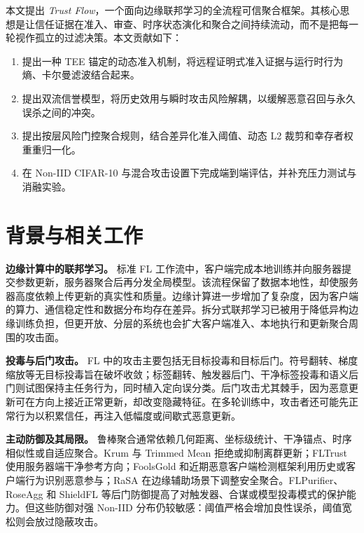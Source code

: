 \documentclass[10pt,a4paper,UTF8,fontset=fandol]{ctexart}
\newenvironment{tightenumerate}{%
  \begin{enumerate}\setlength{\itemsep}{1pt}\setlength{\parskip}{0pt}\setlength{\parsep}{0pt}}{\end{enumerate}}
\begin{document}
本文提出 \emph{Trust Flow}，一个面向边缘联邦学习的全流程可信聚合框架。其核心思想是让信任证据在准入、审查、时序状态演化和聚合之间持续流动，而不是把每一轮视作孤立的过滤决策。本文贡献如下：
\begin{tightenumerate}
    \item 提出一种 TEE 锚定的动态准入机制，将远程证明式准入证据与运行时行为熵、卡尔曼滤波结合起来。
    \item 提出双流信誉模型，将历史效用与瞬时攻击风险解耦，以缓解恶意召回与永久误杀之间的冲突。
    \item 提出按层风险门控聚合规则，结合差异化准入阈值、动态 L2 裁剪和幸存者权重重归一化。
    \item 在 Non-IID CIFAR-10 与混合攻击设置下完成端到端评估，并补充压力测试与消融实验。
\end{tightenumerate}

\section{背景与相关工作}

\textbf{边缘计算中的联邦学习。} 标准 FL 工作流中，客户端完成本地训练并向服务器提交参数更新，服务器聚合后再分发全局模型。该流程保留了数据本地性，却使服务器高度依赖上传更新的真实性和质量。边缘计算进一步增加了复杂度，因为客户端的算力、通信稳定性和数据分布均存在差异。拆分式联邦学习已被用于降低异构边缘训练负担\cite{parallelsfl}，但更开放、分层的系统也会扩大客户端准入、本地执行和更新聚合周围的攻击面。

\textbf{投毒与后门攻击。} FL 中的攻击主要包括无目标投毒和目标后门。符号翻转、梯度缩放等无目标投毒旨在破坏收敛；标签翻转、触发器后门、干净标签投毒和语义后门则试图保持主任务行为，同时植入定向误分类。后门攻击尤其棘手，因为恶意更新可在方向上接近正常更新，却改变隐藏特征\cite{bagdasaryan2020backdoor,wang2019neuralcleanse}。在多轮训练中，攻击者还可能先正常行为以积累信任，再注入低幅度或间歇式恶意更新。

\textbf{主动防御及其局限。} 鲁棒聚合通常依赖几何距离、坐标级统计、干净锚点、时序相似性或自适应聚合。Krum 与 Trimmed Mean 拒绝或抑制离群更新\cite{blanchard2017krum,yin2018byzantine}；FLTrust 使用服务器端干净参考方向\cite{cao2021fltrust}；FoolsGold 和近期恶意客户端检测框架利用历史或客户端行为识别恶意参与\cite{fung2020foolsgold,dou2025toward}；RaSA 在边缘辅助场景下调整安全聚合\cite{wang2025rasa}。FLPurifier、RoseAgg 和 ShieldFL 等后门防御提高了对触发器、合谋或模型投毒模式的保护能力\cite{flpurifier,roseagg,shieldfl}。但这些防御对强 Non-IID 分布仍较敏感：阈值严格会增加良性误杀，阈值宽松则会放过隐蔽攻击。
\end{document}

